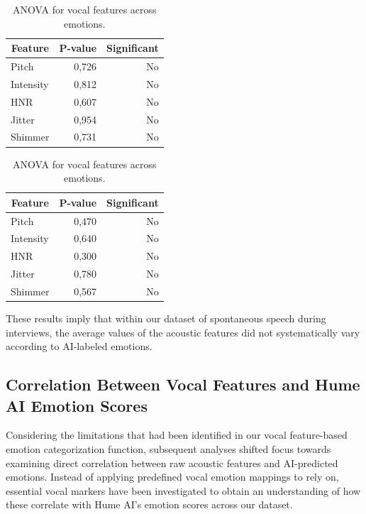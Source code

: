 \begin{table}[H]
    \centering 
    \begin{subtable}[b]{0.48\textwidth}
        \centering
        \caption*{\textbf{Positive recordings}}
        \begin{tabular}{lrr}
        \toprule
        \multicolumn{1}{c}{\textbf{Feature}} & \textbf{P-value} & \textbf{Significant} \\
        \midrule
        Pitch      & 0,726 & No \\
        Intensity  & 0,812 & No \\
        HNR        & 0,607 & No \\
        Jitter     & 0,954 & No \\
        Shimmer    & 0,731 & No \\
        \bottomrule
        \end{tabular}
        \caption{ANOVA: Positive recordings.}
        \label{tab:rq1_anova_pos}
    \end{subtable}
    \hfill
    \begin{subtable}[b]{0.48\textwidth}
        \centering
        \caption*{\textbf{Negative recordings}}
        \begin{tabular}{lrr}
        \toprule
        \multicolumn{1}{c}{\textbf{Feature}} & \textbf{P-value} & \textbf{Significant} \\
        \midrule
        Pitch      & 0,470 & No \\
        Intensity  & 0,640 & No \\
        HNR        & 0,300 & No \\
        Jitter     & 0,780 & No \\
        Shimmer    & 0,567 & No \\
        \bottomrule
        \end{tabular}
        \caption{ANOVA: Negative recordings.}
        \label{tab:rq1_anova_neg}
    \end{subtable}
    \caption{ANOVA for vocal features across emotions.}
    \label{tab:rq1_anova_all}
\end{table}  
  
These results imply that within our dataset of spontaneous speech during interviews, the average values of the acoustic features did not systematically vary according to AI-labeled emotions. 

\subsection{Correlation Between Vocal Features and Hume AI Emotion Scores}
Considering the limitations that had been identified in our vocal feature-based emotion categorization function, subsequent analyses shifted focus towards examining direct correlation between raw acoustic features and AI-predicted emotions. Instead of applying predefined vocal emotion mappings to rely on, essential vocal markers have been investigated to obtain an understanding of how these correlate with Hume AI’s emotion scores across our dataset. 

